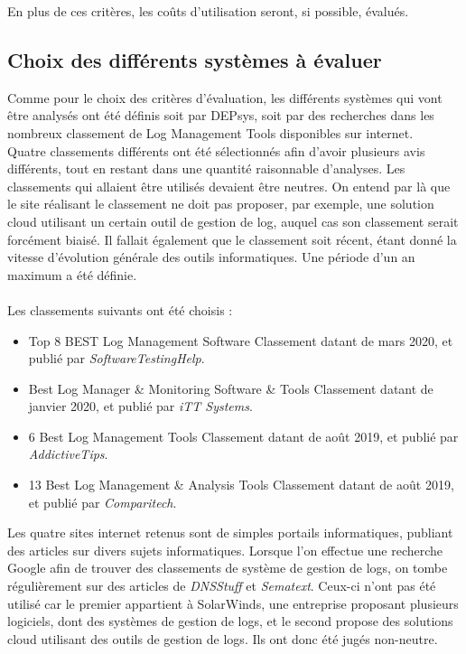 \documentclass[paper=a4, fontsize=11pt]{scrartcl}
\begin{document}
En plus de ces critères, les coûts d'utilisation seront, si possible, évalués.\\

\subsection{Choix des différents systèmes à évaluer}

Comme pour le choix des critères d'évaluation, les différents systèmes qui vont être analysés ont été définis soit par DEPsys, soit par des recherches dans les nombreux classement de \og Log Management Tools \fg disponibles sur internet.\\
Quatre classements différents ont été sélectionnés afin d'avoir plusieurs avis différents, tout en restant dans une quantité raisonnable d'analyses. Les classements qui allaient être utilisés devaient être neutres. On entend par là que le site réalisant le classement ne doit pas proposer, par exemple, une solution cloud utilisant un certain outil de gestion de log, auquel cas son classement serait forcément biaisé. Il fallait également que le classement soit récent, étant donné la vitesse d'évolution générale des outils informatiques. Une période d'un an maximum a été définie.\\\\
Les classements suivants ont été choisis :
\begin{itemize}
    \item Top 8 BEST Log Management Software \cite{noauthor_top_nodate}
    \subitem Classement datant de mars 2020, et publié par \textit{SoftwareTestingHelp}.
    \item Best Log Manager \& Monitoring Software \& Tools \cite{noauthor_best_nodate}
    \subitem Classement datant de janvier 2020, et publié par \textit{iTT Systems}.
    \item 6 Best Log Management Tools \cite{noauthor_6_2019}
    \subitem Classement datant de août 2019, et publié par \textit{AddictiveTips}.
    \item 13 Best Log Management \& Analysis Tools \cite{says_ten_2019}
    \subitem Classement datant de août 2019, et publié par \textit{Comparitech}.
\end{itemize}

Les quatre sites internet retenus sont de simples portails informatiques, publiant des articles sur divers sujets informatiques. Lorsque l'on effectue une recherche Google afin de trouver des classements de système de gestion de logs, on tombe régulièrement sur des articles de \textit{DNSStuff} et \textit{Sematext}. Ceux-ci n'ont pas été utilisé car le premier appartient à SolarWinds, une entreprise proposant plusieurs logiciels, dont des systèmes de gestion de logs, et le second propose des solutions cloud utilisant des outils de gestion de logs. Ils ont donc été jugés non-neutre.
\end{document}
